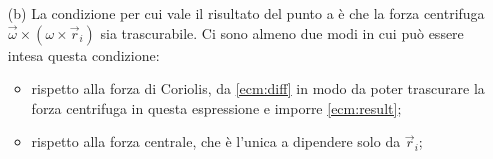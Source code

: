 \documentclass[../main.tex]{subfiles}
\begin{document}
\begin{itemize}
    \begin{equation}
    \label{ecm:result}
    \vec \omega=\frac{e}{2mc} \vec B
    \end{equation}
    e $m \vec \omega \times (\omega \times \vec r_i)$ deve essere trascurabile (rispetto a cosa non \`e chiaro, vedi punto b).
    
    \item[(b)]
    La condizione per cui vale il risultato del punto a \`e che la forza centrifuga  $\vec \omega \times (\omega \times \vec r_i)$ sia trascurabile.
    Ci sono almeno due modi in cui pu\`o essere intesa questa condizione:
    
    \begin{itemize}
      \item rispetto alla forza di Coriolis, da \cref{ecm:diff} in modo da poter trascurare la forza centrifuga in questa espressione e imporre \cref{ecm:result};
      \item rispetto alla forza centrale, che \`e l'unica a dipendere solo da $\vec r_i$;
    \end{itemize}
    
    
  \end{itemize}
\end{document}
